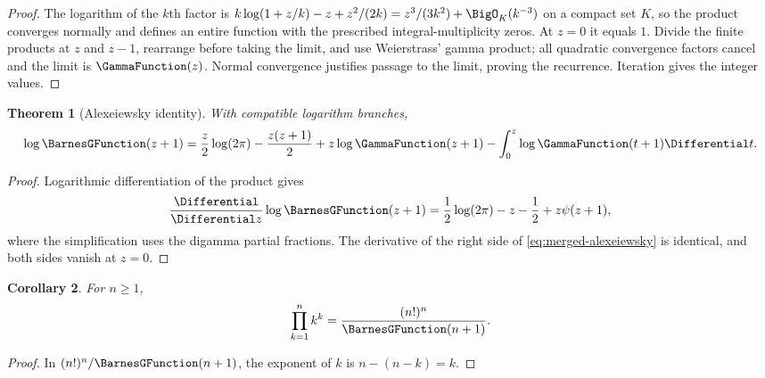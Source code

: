 \documentclass[11pt,a4paper,oneside,openany]{book}
\newtheorem{theorem}{Theorem}[chapter]
\newtheorem{corollary}[theorem]{Corollary}
\theoremstyle{definition}
\theoremstyle{remark}
\begin{document}
\begin{proof}
The logarithm of the $k$th factor is
$k\log(1+z/k)-z+z^2/(2k)=z^3/(3k^2)+\BigO_K(k^{-3})$ on a compact set $K$,
so the product converges normally and defines an entire function with the
prescribed integral-multiplicity zeros.  At $z=0$ it equals $1$.  Divide the
finite products at $z$ and $z-1$, rearrange before taking the limit, and use
Weierstrass' gamma product; all quadratic convergence factors cancel and the
limit is $\GammaFunction(z)$.  Normal convergence justifies passage to the limit,
proving the recurrence.  Iteration gives the integer values.
\end{proof}

\begin{theorem}[Alexeiewsky identity]
\label{thm:merged-alexeiewsky}
With compatible logarithm branches,
\begin{equation}
 \log \BarnesGFunction(z+1)=\frac z2\log(2\pi)-\frac{z(z+1)}2
 +z\log\GammaFunction(z+1)-\int_0^z\log\GammaFunction(t+1)\Differential t.                   \label{eq:merged-alexeiewsky}
\end{equation}
\end{theorem}

\begin{proof}
Logarithmic differentiation of the product gives
\[
 \frac{\Differential}{\Differential z}\log \BarnesGFunction(z+1)
 =\frac12\log(2\pi)-z-\frac12+z\psi(z+1),
\]
where the simplification uses the digamma partial fractions.  The derivative
of the right side of \eqref{eq:merged-alexeiewsky} is identical, and both
sides vanish at $z=0$.
\end{proof}

\begin{corollary}
For $n\geq1$,
\begin{equation}
 \prod_{k=1}^{n}k^k=\frac{(n!)^n}{\BarnesGFunction(n+1)}.                          \label{eq:merged-hyperfactorial}
\end{equation}
\end{corollary}

\begin{proof}
In $(n!)^n/\BarnesGFunction(n+1)$, the exponent of $k$ is $n-(n-k)=k$.
\end{proof}
\end{document}
